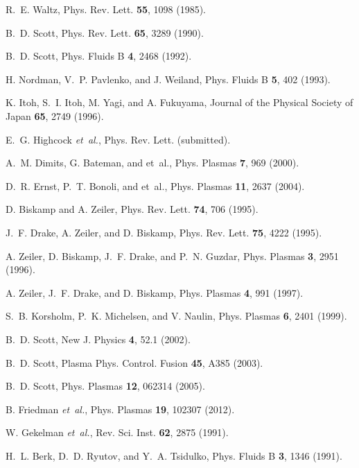 \documentclass[showpacs,preprintnumbers,amsmath,amssymb,superscriptaddress,aip]{revtex4-1}
\begin{document}
\begin{thebibliography}{10}

R.~E. Waltz, Phys. Rev. Lett. {\bf 55},  1098  (1985).

B.~D. Scott, Phys. Rev. Lett. {\bf 65},  3289  (1990).

B.~D. Scott, Phys. Fluids B {\bf 4},  2468  (1992).

H. Nordman, V.~P. Pavlenko, and J. Weiland, Phys. Fluids B {\bf 5},  402
  (1993).

K. Itoh, S.~I. Itoh, M. Yagi, and A. Fukuyama, Journal of the Physical Society
  of Japan {\bf 65},  2749  (1996).

E.~G. Highcock {\it et~al.}, Phys. Rev. Lett.  (submitted).

A.~M. Dimits, G. Bateman, and et~al., Phys. Plasmas {\bf 7},  969  (2000).

D.~R. Ernst, P.~T. Bonoli, and et~al., Phys. Plasmas {\bf 11},  2637  (2004).

D. Biskamp and A. Zeiler, Phys. Rev. Lett. {\bf 74},  706  (1995).

J.~F. Drake, A. Zeiler, and D. Biskamp, Phys. Rev. Lett. {\bf 75},  4222
  (1995).

A. Zeiler, D. Biskamp, J.~F. Drake, and P.~N. Guzdar, Phys. Plasmas {\bf 3},
  2951  (1996).

A. Zeiler, J.~F. Drake, and D. Biskamp, Phys. Plasmas {\bf 4},  991  (1997).

S.~B. Korsholm, P.~K. Michelsen, and V. Naulin, Phys. Plasmas {\bf 6},  2401
  (1999).

B.~D. Scott, New J. Physics {\bf 4},  52.1  (2002).

B.~D. Scott, Plasma Phys. Control. Fusion {\bf 45},  A385  (2003).

B.~D. Scott, Phys. Plasmas {\bf 12},  062314  (2005).

B. Friedman {\it et~al.}, Phys. Plasmas {\bf 19},  102307  (2012).

W. Gekelman {\it et~al.}, Rev. Sci. Inst. {\bf 62},  2875  (1991).

H.~L. Berk, D.~D. Ryutov, and Y.~A. Tsidulko, Phys. Fluids B {\bf 3},  1346
  (1991).


\end{thebibliography}
\end{document}
